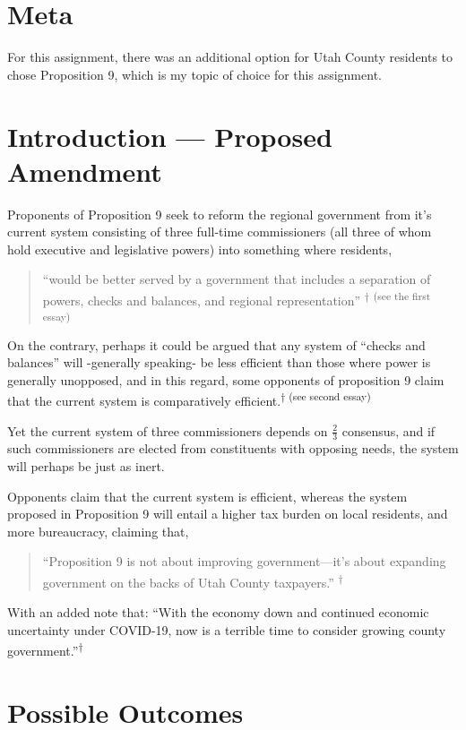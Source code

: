 
\section{Meta}

For this assignment, there was an additional option for Utah County residents to chose Proposition 9, which is my topic of choice for this assignment. 


\section{Introduction — Proposed Amendment}

Proponents of Proposition 9 seek to reform the regional government from it’s current system consisting of three full-time commissioners (all three of whom hold executive and legislative powers) into something where residents,
\begin{quotation}
    ``would be better served by a government that includes a separation of powers, checks and balances, and regional representation'' \textsuperscript{†} \textsuperscript{(see the first essay)}
\end{quotation}

On the contrary, perhaps it could be argued that any system of ``checks and balances'' will -generally speaking- be less efficient than those where power is generally unopposed, and in this regard, some opponents of proposition 9 claim that the current system is comparatively efficient.\textsuperscript{† (see second essay)}

Yet the current system of three commissioners depends on $\frac{2}{3}$ consensus, and if such commissioners are elected from constituents with opposing needs, the system will perhaps be just as inert.

Opponents claim that the current system is efficient, whereas the system proposed in Proposition 9 will entail a higher tax burden on local residents, and more bureaucracy, claiming that, 
\begin{quotation}
    ``Proposition 9 is not about improving government—it’s about expanding government on the backs of Utah County taxpayers.'' \textsuperscript{†}
\end{quotation}

With an added note that: ``With the economy down and continued economic uncertainty under COVID-19, now is a terrible time to consider growing county government.''\textsuperscript{†} 

\section{Possible Outcomes}

